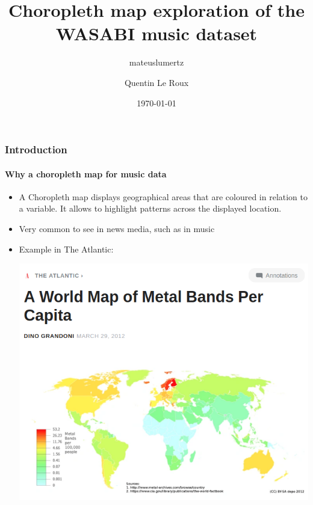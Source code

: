 \documentclass[aspectratio=43,10pt]{beamer}
\author{mateuslumertz}
\title[Choropleth map on WASABI]{Choropleth map exploration of the WASABI music dataset}
\author{Quentin Le Roux}
\date{\today}
\begin{document}
\begin{frame}[plain]
\maketitle
\end{frame}

\begin{frame}
    \frametitle{Introduction}
    \framesubtitle{Why a choropleth map for music data}
    
    \begin{itemize}
        \item A Choropleth map displays geographical areas that are coloured in relation to a variable. It allows to highlight patterns across the displayed location.
        \item Very common to see in news media, such as in music
        \item Example in The Atlantic:
        \begin{center}
            \includegraphics[width=0.6\linewidth]{imagens/atlantic_article.png}
        \end{center}
    \end{itemize}
\end{frame}
\end{document}
